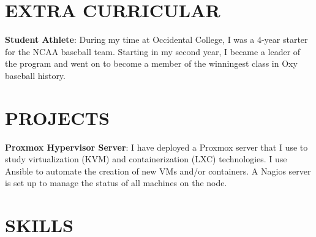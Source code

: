 \documentclass[margin]{res}
\begin{document}
\begin{resume}
\section{EXTRA CURRICULAR}
\par
\par
\textbf{Student Athlete}: During my time at Occidental College, I was a 4-year starter for the NCAA baseball team. Starting in my second year, I became a leader of the program and went on to become a member of the winningest class in Oxy baseball history.
\par

\section{PROJECTS}
\par
\textbf{Proxmox Hypervisor Server}:
I have deployed a Proxmox server that I use to study virtualization (KVM) and containerization (LXC) technologies. I use Ansible to automate the creation of new VMs and/or containers. A Nagios server is set up to manage the status of all machines on the node.

\section{SKILLS}


\end{resume}
\end{document}
